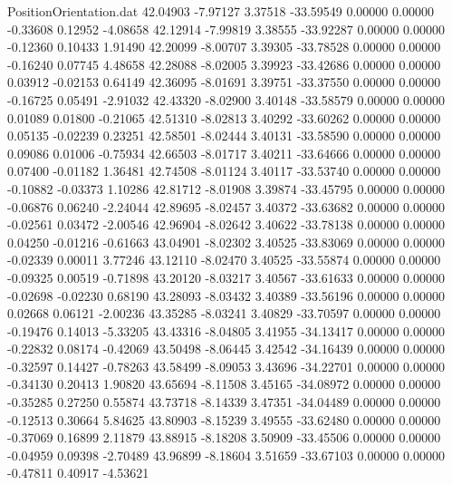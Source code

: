\begin{filecontents}{PositionOrientation.dat}
  42.04903   -7.97127    3.37518   -33.59549    0.00000    0.00000   -0.33608    0.12952   -4.08658
  42.12914   -7.99819    3.38555   -33.92287    0.00000    0.00000   -0.12360    0.10433    1.91490
  42.20099   -8.00707    3.39305   -33.78528    0.00000    0.00000   -0.16240    0.07745    4.48658
  42.28088   -8.02005    3.39923   -33.42686    0.00000    0.00000    0.03912   -0.02153    0.64149
  42.36095   -8.01691    3.39751   -33.37550    0.00000    0.00000   -0.16725    0.05491   -2.91032
  42.43320   -8.02900    3.40148   -33.58579    0.00000    0.00000    0.01089    0.01800   -0.21065
  42.51310   -8.02813    3.40292   -33.60262    0.00000    0.00000    0.05135   -0.02239    0.23251
  42.58501   -8.02444    3.40131   -33.58590    0.00000    0.00000    0.09086    0.01006   -0.75934
  42.66503   -8.01717    3.40211   -33.64666    0.00000    0.00000    0.07400   -0.01182    1.36481
  42.74508   -8.01124    3.40117   -33.53740    0.00000    0.00000   -0.10882   -0.03373    1.10286
  42.81712   -8.01908    3.39874   -33.45795    0.00000    0.00000   -0.06876    0.06240   -2.24044
  42.89695   -8.02457    3.40372   -33.63682    0.00000    0.00000   -0.02561    0.03472   -2.00546
  42.96904   -8.02642    3.40622   -33.78138    0.00000    0.00000    0.04250   -0.01216   -0.61663
  43.04901   -8.02302    3.40525   -33.83069    0.00000    0.00000   -0.02339    0.00011    3.77246
  43.12110   -8.02470    3.40525   -33.55874    0.00000    0.00000   -0.09325    0.00519   -0.71898
  43.20120   -8.03217    3.40567   -33.61633    0.00000    0.00000   -0.02698   -0.02230    0.68190
  43.28093   -8.03432    3.40389   -33.56196    0.00000    0.00000    0.02668    0.06121   -2.00236
  43.35285   -8.03241    3.40829   -33.70597    0.00000    0.00000   -0.19476    0.14013   -5.33205
  43.43316   -8.04805    3.41955   -34.13417    0.00000    0.00000   -0.22832    0.08174   -0.42069
  43.50498   -8.06445    3.42542   -34.16439    0.00000    0.00000   -0.32597    0.14427   -0.78263
  43.58499   -8.09053    3.43696   -34.22701    0.00000    0.00000   -0.34130    0.20413    1.90820
  43.65694   -8.11508    3.45165   -34.08972    0.00000    0.00000   -0.35285    0.27250    0.55874
  43.73718   -8.14339    3.47351   -34.04489    0.00000    0.00000   -0.12513    0.30664    5.84625
  43.80903   -8.15239    3.49555   -33.62480    0.00000    0.00000   -0.37069    0.16899    2.11879
  43.88915   -8.18208    3.50909   -33.45506    0.00000    0.00000   -0.04959    0.09398   -2.70489
  43.96899   -8.18604    3.51659   -33.67103    0.00000    0.00000   -0.47811    0.40917   -4.53621

\end{filecontents}
